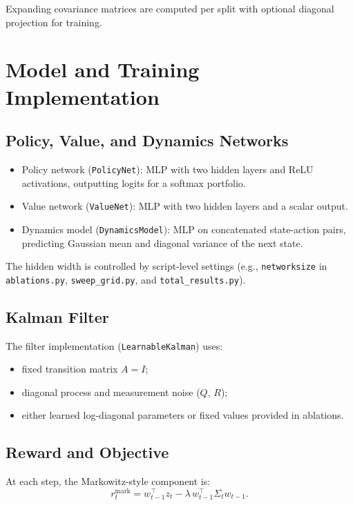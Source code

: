 Expanding covariance matrices are computed per split with optional diagonal
projection for training.

\section{Model and Training Implementation}

\subsection{Policy, Value, and Dynamics Networks}

\begin{itemize}
    \item Policy network (\texttt{PolicyNet}): MLP with two hidden layers and
    ReLU activations, outputting logits for a softmax portfolio.
    \item Value network (\texttt{ValueNet}): MLP with two hidden layers and a
    scalar output.
    \item Dynamics model (\texttt{DynamicsModel}): MLP on concatenated
    state-action pairs, predicting Gaussian mean and diagonal variance of the
    next state.
\end{itemize}

The hidden width is controlled by script-level settings (e.g.,
\texttt{networksize} in \texttt{ablations.py}, \texttt{sweep\_grid.py}, and
\texttt{total\_results.py}).

\subsection{Kalman Filter}

The filter implementation (\texttt{LearnableKalman}) uses:
\begin{itemize}
    \item fixed transition matrix $A = I$;
    \item diagonal process and measurement noise ($Q$, $R$);
    \item either learned log-diagonal parameters or fixed values provided in
    ablations.
\end{itemize}

\subsection{Reward and Objective}

At each step, the Markowitz-style component is:
\[
r^{\text{mark}}_t
= w_{t-1}^\top z_t
- \lambda \, w_{t-1}^\top \Sigma_t w_{t-1}.
\]

